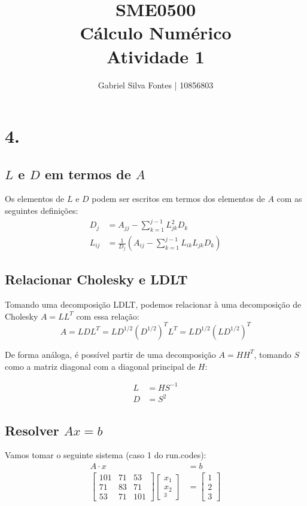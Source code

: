 \documentclass[12pt]{article}
\title{SME0500 \\ Cálculo Numérico \\ Atividade 1}
\author{Gabriel Silva Fontes | 10856803}
\begin{document}
\maketitle
\section*{4.}
\subsection{\(L\) e \(D\) em termos de \(A\)}
Os elementos de \(L\) e \(D\) podem ser escritos em termos dos elementos de \(A\) com as seguintes definições:
\begin{align*}
    D_j &= A_{jj} - \sum_{k=1}^{j-1}L^2_{jk} D_k \\
    L_{ij} &= \frac{1}{D_j} \left( A_{ij} - \sum_{k=1}^{j-1} L_{ik} L_{jk} D_k \right)
\end{align*}

\subsection{Relacionar Cholesky e LDLT}
Tomando uma decomposição LDLT, podemos relacionar à uma decomposição de Cholesky \(A = LL^T\) com essa relação:
\[
    A = LDL^T = LD^{1/2} {(D^{1/2})}^T L^T = LD^{1/2} {(LD^{1/2})}^T
\]

De forma análoga, é possível partir de uma decomposição \(A = HH^T\), tomando \(S\) como a matriz diagonal com a diagonal principal de \(H\):

\begin{align*}
    L &= HS^{-1} \\
    D &= S^2
\end{align*}

\subsection{Resolver \(Ax = b\)}
Vamos tomar o seguinte sistema (caso 1 do run.codes):
\begin{align*}
    A \cdot x &= b \\
    \begin{bmatrix}
        101 & 71 & 53 \\
         71 & 83 & 71 \\
         53 & 71 & 101
    \end{bmatrix}
    \begin{bmatrix}
        x_1 \\
        x_2 \\
        _3
    \end{bmatrix}
    &=
    \begin{bmatrix}
        1\\
        2\\
        3
    \end{bmatrix}
\end{align*}
\end{document}
